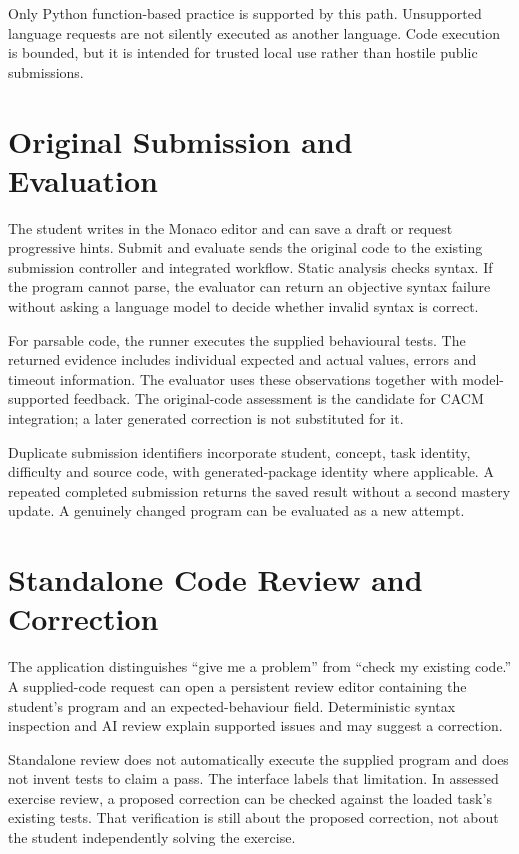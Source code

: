 Only Python function-based practice is supported by this path. Unsupported language requests are not silently executed as another language. Code execution is bounded, but it is intended for trusted local use rather than hostile public submissions.

\section{Original Submission and Evaluation}
The student writes in the Monaco editor and can save a draft or request progressive hints. Submit and evaluate sends the original code to the existing submission controller and integrated workflow. Static analysis checks syntax. If the program cannot parse, the evaluator can return an objective syntax failure without asking a language model to decide whether invalid syntax is correct.

For parsable code, the runner executes the supplied behavioural tests. The returned evidence includes individual expected and actual values, errors and timeout information. The evaluator uses these observations together with model-supported feedback. The original-code assessment is the candidate for CACM integration; a later generated correction is not substituted for it.

Duplicate submission identifiers incorporate student, concept, task identity, difficulty and source code, with generated-package identity where applicable. A repeated completed submission returns the saved result without a second mastery update. A genuinely changed program can be evaluated as a new attempt.

\section{Standalone Code Review and Correction}
The application distinguishes ``give me a problem'' from ``check my existing code.'' A supplied-code request can open a persistent review editor containing the student's program and an expected-behaviour field. Deterministic syntax inspection and AI review explain supported issues and may suggest a correction.

Standalone review does not automatically execute the supplied program and does not invent tests to claim a pass. The interface labels that limitation. In assessed exercise review, a proposed correction can be checked against the loaded task's existing tests. That verification is still about the proposed correction, not about the student independently solving the exercise.

